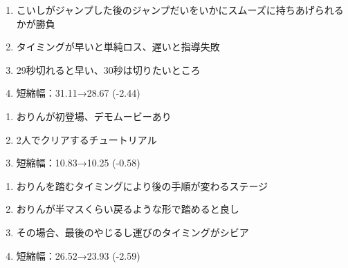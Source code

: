\clearpage
\begin{enumerate}[label={\sarrow}]
\item こいしがジャンプした後のジャンプだいをいかにスムーズに持ちあげられるかが勝負
\item タイミングが早いと単純ロス、遅いと指導失敗
\item 29秒切れると早い、30秒は切りたいところ
\item 短縮幅：31.11→28.67 (-2.44)
\end{enumerate}








\begin{enumerate}[label={\sarrow}]
\item おりんが初登場、デモムービーあり
\item 2人でクリアするチュートリアル
\item 短縮幅：10.83→10.25 (-0.58)
\end{enumerate}



\begin{enumerate}[label={\sarrow}]
\item おりんを踏むタイミングにより後の手順が変わるステージ
\item おりんが半マスくらい戻るような形で踏めると良し
\item その場合、最後のやじるし運びのタイミングがシビア
\item 短縮幅：26.52→23.93 (-2.59)
\end{enumerate}



